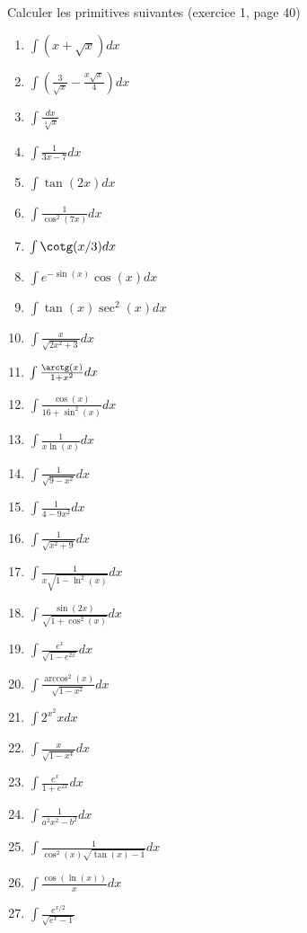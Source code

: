 \begin{exercice}\label{exo0017}

Calculer les primitives suivantes (exercice 1, page 40)
\renewcommand{\theenumi}{\arabic{enumi}}
\begin{multicols}{3}
\begin{enumerate}
\item
$\int (x+\sqrt{x})dx$
\item
$\int \left( \frac{ 3 }{ \sqrt{x} }-\frac{ x\sqrt{x} }{ 4 } \right) dx$
\item
$\int \frac{ dx }{ \sqrt[4]{x} }$
\item
$\int \frac{1}{ 3x-7 } dx$
\item
$\int \tan(2x) dx$
\item
$\int \frac{1}{ \cos^2(7x) } dx$
\item
$\int \cotg(x/3) dx$
\item
$\int  e^{-\sin(x)}\cos(x) dx$
\item
$\int \tan(x)\sec^2(x) dx$
\item
$\int \frac{ x }{ \sqrt{2x^2+3} } dx$
\item
$\int \frac{ \arctg(x) }{ 1+x^2 } dx$
\item
$\int \frac{ \cos(x) }{ 16+\sin^2(x) } dx$
\item
$\int \frac{1}{ x\ln(x) } dx$
\item
$\int \frac{1}{ \sqrt{9-x^2} } dx$
\item
$\int \frac{1}{ 4-9x^2 } dx$
\item
$\int \frac{1}{ \sqrt{x^2+9} } dx$
\item
$\int \frac{ 1 }{ x\sqrt{1-\ln^2(x)} } dx$
\item
$\int \frac{ \sin(2x) }{ \sqrt{1+\cos^2(x)} } dx$
\item
$\int \frac{ e^x }{ \sqrt{1- e^{2x}} } dx$
\item
$\int \frac{ \arccos^2(x) }{ \sqrt{1-x^2} } dx$
\item
$\int 2^{x^2}x dx$
\item
$\int \frac{ x }{ \sqrt{1-x^4} } dx$
\item
$\int \frac{ e^x }{ 1+ e^{2x} } dx$
\item
$\int \frac{1}{ a^2x^2-b^2 } dx$
\item
$\int \frac{1}{ \cos^2(x)\sqrt{\tan(x)-1} } dx$
\item
$\int \frac{ \cos(\ln(x))}{ x } dx$
\item
$\int \frac{  e^{x/2} }{ \sqrt{e^x-1} }$


\end{enumerate}
\end{multicols}
\end{exercice}
